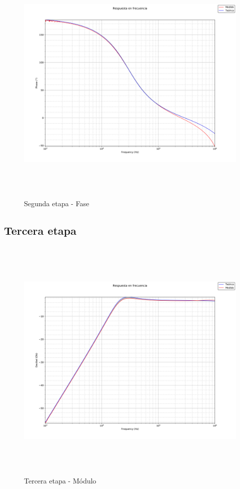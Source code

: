 \begin{figure}[H] %
	\centering
	\includegraphics[width=12cm,height=12cm,keepaspectratio]{../Imagenes/SECOND_PHA.png}
	\caption{Segunda etapa - Fase}
	\label{2P}
\end{figure}

\subsection{Tercera etapa}

 \begin{figure}[H] %
	\centering
	\includegraphics[width=12cm,height=12cm,keepaspectratio]{../Imagenes/THIRD_MOD.png}
	\caption{Tercera etapa - M\'odulo}
	\label{thirdmod}
\end{figure}

